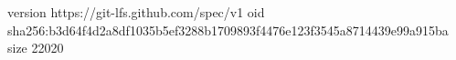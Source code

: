 version https://git-lfs.github.com/spec/v1
oid sha256:b3d64f4d2a8df1035b5ef3288b1709893f4476e123f3545a8714439e99a915ba
size 22020
